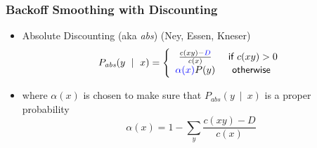 \begin{frame}
\frametitle{Backoff Smoothing with Discounting}
\begin{itemize}[<+->]
\item Absolute Discounting (aka \textit{abs}) (Ney, Essen, Kneser)
\[ P_{\textit{abs}}(y~\mid~x) = \left\{ 
\begin{array}{cc}
\frac{ c(xy) - {\color{blue}{D}} }{ c(x) } & \textsf{ if $c(xy) > 0$} \\
{\color{blue}{\alpha(x)}} P(y) & \textsf{otherwise}
\end{array}
\right. \]
\item where $\alpha(x)$ is chosen to make sure that $P_{\textit{abs}}(y~\mid~x)$ is a proper probability
\[ \alpha(x) = 1 - \sum_y \frac{ c(xy) - D }{ c(x) } \]
\end{itemize}
\end{frame}

